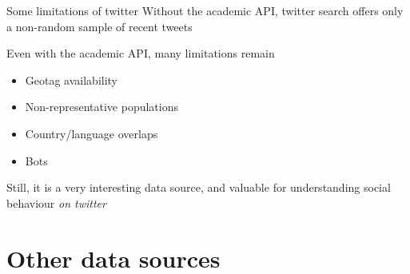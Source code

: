 \documentclass[
  10pt,
  ignorenonframetext,
  aspectratio=169]{beamer}
\providecommand{\tightlist}{%
  \setlength{\itemsep}{0pt}\setlength{\parskip}{0pt}}
\begin{document}
\begin{frame}{Some limitations of twitter}
\protect\hypertarget{some-limitations-of-twitter}{}
Without the academic API, twitter search offers only a non-random sample
of recent tweets

Even with the academic API, many limitations remain

\begin{itemize}
\tightlist
\item
  Geotag availability
\item
  Non-representative populations
\item
  Country/language overlaps
\item
  Bots
\end{itemize}

Still, it is a very interesting data source, and valuable for
understanding social behaviour \emph{on twitter}
\end{frame}

\hypertarget{other-data-sources}{%
\section{Other data sources}\label{other-data-sources}}
\end{document}
